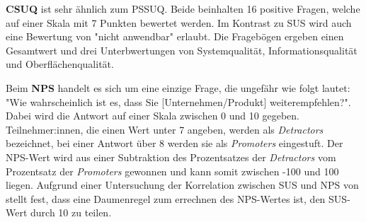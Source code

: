 \textbf{\ac{CSUQ}} ist sehr ähnlich zum \ac{PSSUQ}. Beide beinhalten 16 positive Fragen, welche auf einer Skala mit 7 Punkten bewertet werden. Im Kontrast zu \ac{SUS} wird auch eine Bewertung von "nicht anwendbar" erlaubt. Die Fragebögen ergeben einen Gesamtwert und drei Unterbwertungen von Systemqualität, Informationsqualität und Oberflächenqualität. \parencite{barnumUsabilityTesting2021} 

Beim \textbf{\ac{NPS}} handelt es sich um eine einzige Frage, die ungefähr wie folgt lautet: "Wie wahrscheinlich ist es, dass Sie [Unternehmen/Produkt] weiterempfehlen?". Dabei wird die Antwort auf einer Skala zwischen 0 und 10 gegeben. Teilnehmer:innen, die einen Wert unter 7 angeben, werden als \textit{Detractors} bezeichnet, bei einer Antwort über 8 werden sie als \textit{Promoters} eingestuft. Der \ac{NPS}-Wert wird aus einer Subtraktion des Prozentsatzes der \textit{Detractors} vom Prozentsatz der \textit{Promoters} gewonnen und kann somit zwischen -100 und 100 liegen.  Aufgrund einer Untersuchung der Korrelation zwischen \ac{SUS} und \ac{NPS} von \textcite{sauroDoesBetter2010} stellt \textcite{barnumUsabilityTesting2021} fest, dass eine Daumenregel zum errechnen des \ac{NPS}-Wertes ist, den \ac{SUS}-Wert durch 10 zu teilen. 

